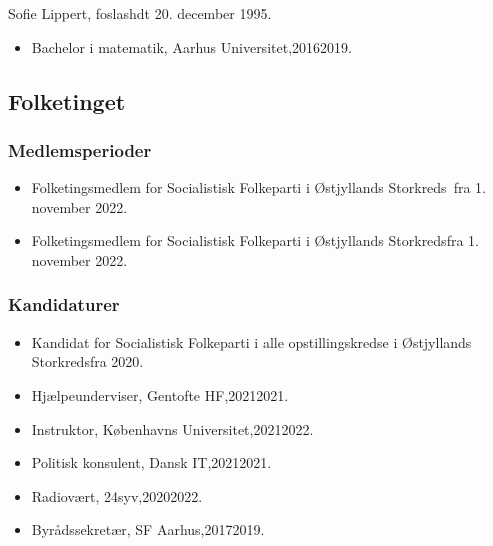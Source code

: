 \documentclass[11pt, a4paper]{awesome-cv}
\begin{document}
\makecvheader[R]
\makelettertitle
\begin{cvletter}
Sofie Lippert, foslashdt 20. december 1995.

\begin{itemize}
\item Bachelor i matematik, Aarhus Universitet,20162019.
\end{itemize}
\subsection*{Folketinget}
\subsubsection*{Medlemsperioder}
\begin{itemize}
\item Folketingsmedlem for Socialistisk Folkeparti i Østjyllands Storkreds fra 1. november 2022.
\item Folketingsmedlem for Socialistisk Folkeparti i Østjyllands Storkredsfra 1. november 2022.
\end{itemize}
\subsubsection*{Kandidaturer}
\begin{itemize}
\item Kandidat for Socialistisk Folkeparti i alle opstillingskredse i Østjyllands Storkredsfra 2020.
\end{itemize}
\begin{itemize}
\item Hjælpeunderviser, Gentofte HF,20212021.
\item Instruktor, Københavns Universitet,20212022.
\item Politisk konsulent, Dansk IT,20212021.
\item Radiovært, 24syv,20202022.
\item Byrådssekretær, SF Aarhus,20172019.
\end{itemize}
\end{cvletter}
\end{document}
